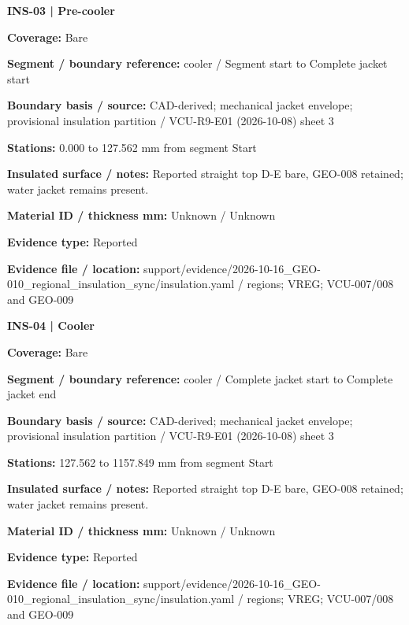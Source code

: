 \documentclass[11pt]{article}
\begin{document}
\par\noindent\begin{minipage}{\textwidth}\small\setlength{\parskip}{2pt}
{\bfseries INS-03 | Pre-cooler}\par
\textbf{Coverage:} Bare\par
\textbf{Segment / boundary reference:} cooler / Segment start to Complete jacket start\par
\textbf{Boundary basis / source:} CAD-derived; mechanical jacket envelope; provisional insulation partition / VCU-R9-E01 (2026-10-08) sheet 3\par
\textbf{Stations:} 0.000 to 127.562 mm from segment Start\par
\textbf{Insulated surface / notes:} Reported straight top D-E bare, GEO-008 retained; water jacket remains present.\par
\textbf{Material ID / thickness mm:} Unknown / Unknown\par
\textbf{Evidence type:} Reported\par
\textbf{Evidence file / location:} support/evidence/2026-10-16\_\allowbreak{}GEO-010\_\allowbreak{}regional\_\allowbreak{}insulation\_\allowbreak{}sync/insulation.yaml / regions; VREG; VCU-007/008 and GEO-009\par
\end{minipage}\par\vspace{5pt}
\par\noindent\begin{minipage}{\textwidth}\small\setlength{\parskip}{2pt}
{\bfseries INS-04 | Cooler}\par
\textbf{Coverage:} Bare\par
\textbf{Segment / boundary reference:} cooler / Complete jacket start to Complete jacket end\par
\textbf{Boundary basis / source:} CAD-derived; mechanical jacket envelope; provisional insulation partition / VCU-R9-E01 (2026-10-08) sheet 3\par
\textbf{Stations:} 127.562 to 1157.849 mm from segment Start\par
\textbf{Insulated surface / notes:} Reported straight top D-E bare, GEO-008 retained; water jacket remains present.\par
\textbf{Material ID / thickness mm:} Unknown / Unknown\par
\textbf{Evidence type:} Reported\par
\textbf{Evidence file / location:} support/evidence/2026-10-16\_\allowbreak{}GEO-010\_\allowbreak{}regional\_\allowbreak{}insulation\_\allowbreak{}sync/insulation.yaml / regions; VREG; VCU-007/008 and GEO-009\par
\end{minipage}\par\vspace{5pt}
\end{document}
